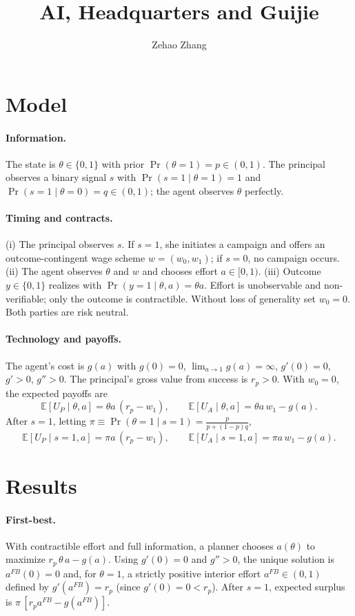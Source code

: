 \documentclass[11pt]{article}
\title{AI, Headquarters and Guijie}
\author{Zehao Zhang}
\begin{document}
\maketitle

\section{Model}

\paragraph{Information.} The state is $\theta\in\{0,1\}$ with prior $\Pr(\theta=1)=p\in(0,1)$. The principal observes a binary signal $s$ with $\Pr(s=1\mid \theta=1)=1$ and $\Pr(s=1\mid \theta=0)=q\in(0,1)$; the agent observes $\theta$ perfectly. 

\paragraph{Timing and contracts.} (i) The principal observes $s$. If $s=1$, she initiates a campaign and offers an outcome-contingent wage scheme $w=(w_0,w_1)$; if $s=0$, no campaign occurs. (ii) The agent observes $\theta$ and $w$ and chooses effort $a\in[0,1)$. (iii) Outcome $y\in\{0,1\}$ realizes with $\Pr(y=1\mid \theta,a)=\theta a$. Effort is unobservable and non-verifiable; only the outcome is contractible. Without loss of generality set $w_0=0$. Both parties are risk neutral.

\paragraph{Technology and payoffs.} The agent's cost is $g(a)$ with $g(0)=0$, $\lim_{a\to 1}g(a)=\infty$, $g'(0)=0$, $g'>0$, $g''>0$. The principal's gross value from success is $r_p>0$. With $w_0=0$, the expected payoffs are
\[
\mathbb{E}[U_P\mid \theta,a]=\theta a\,(r_p-w_1),\qquad \mathbb{E}[U_A\mid \theta,a]=\theta a\,w_1-g(a).
\]
After $s=1$, letting $\pi\equiv \Pr(\theta=1\mid s=1) = \frac{p}{p+(1-p)q}$,
\[
\mathbb{E}[U_P\mid s=1,a]=\pi a\,(r_p-w_1),\qquad \mathbb{E}[U_A\mid s=1,a]=\pi a\,w_1-g(a).
\]

\section{Results}

\paragraph{First-best.} With contractible effort and full information, a planner chooses $a(\theta)$ to maximize $r_p\,\theta\,a-g(a)$. Using $g'(0)=0$ and $g''>0$, the unique solution is $a^{FB}(0)=0$ and, for $\theta=1$, a strictly positive interior effort $a^{FB}\in(0,1)$ defined by $g'(a^{FB})=r_p$ (since $g'(0)=0<r_p$). After $s=1$, expected surplus is $\pi\,[r_p a^{FB}-g(a^{FB})]$.
\end{document}
